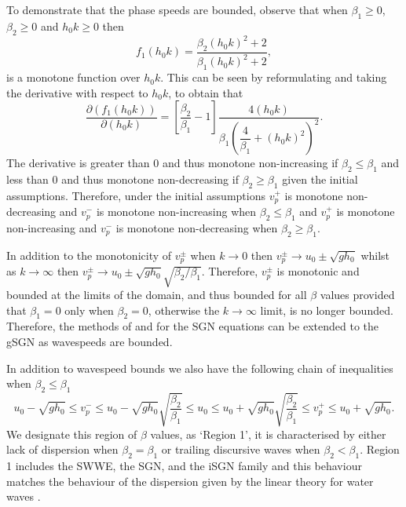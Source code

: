 \documentclass[10pt]{elsarticle}
\begin{document}
To demonstrate that the phase speeds are bounded, observe that when $\beta_1 \ge 0$, $\beta_2 \ge 0$ and $h_0 k \ge 0$ then
\begin{equation*}
f_1(h_0k) = \dfrac{\beta_2 \left(h_0 k\right)^2 + 2}{\beta_1 \left(h_0 k\right)^2 + 2},
\end{equation*}
is a monotone function over $h_0 k$. This can be seen by reformulating and taking the derivative with respect to $h_0 k$, to obtain that 
\begin{equation*}
 \dfrac{\partial \left(f_1(h_0k)\right)}{\partial \left(h_0 k\right)} = \left[\dfrac{\beta_2}{\beta_1} - 1\right] \dfrac{4\left(h_0 k\right)}{\beta_1\left( \dfrac{4}{\beta_1} + \left(h_0 k\right)^2\right)^2}.
\end{equation*}
The derivative is greater than $0$ and thus monotone non-increasing if $\beta_2 \le \beta_1$ and less than $0$ and thus monotone non-decreasing if $\beta_2 \ge  \beta_1$  given the initial assumptions. Therefore, under the initial assumptions $v^+_p$ is monotone non-decreasing and $v^-_p$ is monotone non-increasing when $\beta_2 \le  \beta_1$ and $v^+_p$ is monotone non-increasing and $v^-_p$ is monotone non-decreasing when $\beta_2 \ge  \beta_1$. 

In addition to the monotonicity of $v^\pm_p$ when $k \rightarrow 0$ then $v^\pm_p \rightarrow u_0 \pm \sqrt{gh_0}$ whilst as $k \rightarrow \infty$ then $v^\pm_p \rightarrow u_0 \pm \sqrt{gh_0} \sqrt{{\beta_2}/ \beta_1 }$. Therefore, $v^\pm_p$ is monotonic and bounded at the limits of the domain, and thus bounded for all $\beta$ values provided that $\beta_1 = 0$ only when $\beta_2 = 0$, otherwise the $k \rightarrow \infty$ limit, is no longer bounded. Therefore, the methods of \citet{Hank-etal-2010-2034} and \citet{Zoppou-etal-2017} for the SGN equations can be extended to the gSGN as wavespeeds are bounded.

In addition to wavespeed bounds we also have the following chain of inequalities when ${\beta_2} \le \beta_1$ 
\begin{equation}
u_0 -  \sqrt{gh_0} \le  v^-_p \le u_0 - \sqrt{gh_0} \sqrt{\dfrac{\beta_2}{ \beta_1}} \le u_0 \le u_0 + \sqrt{gh_0} \sqrt{\dfrac{\beta_2}{\beta_1}} \le   v^+_p  \le u_0 +   \sqrt{gh_0}.
\label{eq:wavespeedbound1}
\end{equation}
We designate this region of $\beta$ values, as `Region 1', it is characterised by either lack of dispersion when $\beta_2 =  \beta_1$ or trailing discursive waves when $\beta_2 <  \beta_1$. Region 1 includes the SWWE, the SGN, and the iSGN family and this behaviour matches the behaviour of the dispersion given by the linear theory for water waves \cite{Whitham-1967-399}. 
\end{document}
